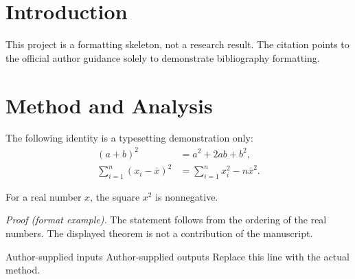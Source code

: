 \section{Introduction}
\label{sec:introduction}
This project is a formatting skeleton, not a research result. The citation
\cite{formatguide} points to the official author guidance solely to demonstrate bibliography formatting.

\section{Method and Analysis}
\label{sec:method}
The following identity is a typesetting demonstration only:
\begin{equation}
\label{eq:identity}
\begin{aligned}
 (a+b)^2 &= a^2 + 2ab + b^2,\\
 \sum_{i=1}^{n}(x_i-\bar x)^2
 &= \sum_{i=1}^{n}x_i^2-n\bar x^2.
\end{aligned}
\end{equation}
\begin{PWTheorem}
For a real number $x$, the square $x^2$ is nonnegative.
\end{PWTheorem}
\textit{Proof (format example).} The statement follows from the ordering of the real numbers.
The displayed theorem is not a contribution of the manuscript.

\begin{algorithm}[htbp]
\caption{Pseudocode formatting example only}
\label{alg:format}
\begin{algorithmic}[1]
\REQUIRE Author-supplied inputs
\ENSURE Author-supplied outputs
\STATE Replace this line with the actual method.
\end{algorithmic}
\end{algorithm}

